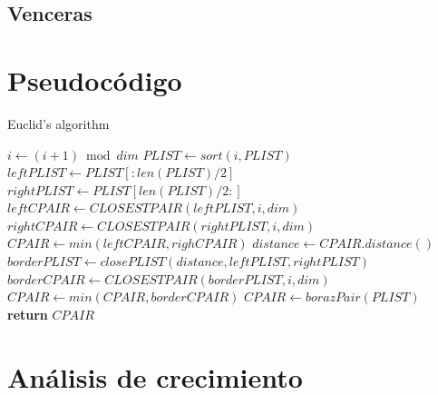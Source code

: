\documentclass{article}
\begin{document}
	\subsection{Venceras}
		\paragraph{}





\section{Pseudocódigo}
\begin{algorithm}

	\caption{Euclid’s algorithm}

	\label{euclid}

	\begin{algorithmic}[1] %

	  
		\State
			\State
			\State $i\gets(i+1) \bmod dim$
			\State
			\State $PLIST \gets sort(i, PLIST)$
			\State
			\State $leftPLIST \gets PLIST[:len(PLIST)/2]$
			\State
			\State $rightPLIST \gets PLIST[len(PLIST)/2:]$
			\State
			\State $leftCPAIR \gets CLOSESTPAIR(leftPLIST, i, dim)$
			\State
			\State $rightCPAIR \gets CLOSESTPAIR(rightPLIST, i, dim)$
			\State
			\State $CPAIR \gets min(leftCPAIR, righCPAIR)$
			\State
			\State $distance \gets CPAIR.distance()$
			\State
			\State $borderPLIST \gets closePLIST(distance, leftPLIST, rightPLIST)$
			\State
			\State $borderCPAIR \gets CLOSESTPAIR(borderPLIST, i , dim)$
			\State
			\State $CPAIR \gets min(CPAIR, borderCPAIR)$
			\State
		\Else
			\State
			\State $CPAIR \gets borazPair(PLIST)$
			\State
		\EndIf
		\State
		\State \textbf{return} $CPAIR$
	\State
	\EndProcedure

	\end{algorithmic}

\end{algorithm}


\section{Análisis de crecimiento}
\end{document}
